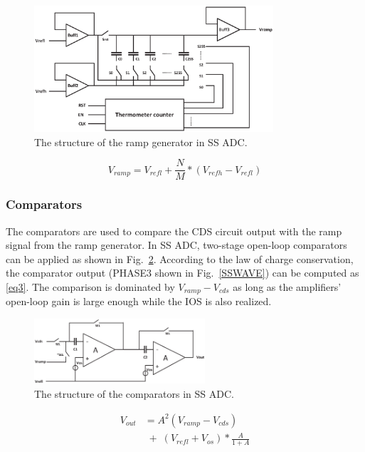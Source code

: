 \begin{figure}[htbp]
	\centerline{\includegraphics[width=3.5in]{./Figures/RAMP.eps}}
	\caption{The structure of the ramp generator in SS ADC.}
	\label{RAMP}
\end{figure} 

\begin{equation}
	V_{ramp}=V_{refl}+\frac{N}{M}\ast\left(V_{refh}-V_{refl}\right)
	\label{eq2}
\end{equation}

\subsubsection{Comparators}

The comparators are used to compare the CDS circuit output with the ramp signal from the ramp generator. 
In SS ADC, two-stage open-loop comparators can be applied as shown in Fig.~\ref{COM}. According to the law of charge conservation, 
the comparator output (PHASE3 shown in Fig.~\ref{SSWAVE}) can be computed as \eqref{eq3}. The comparison is dominated by $V_{ramp}-V_{cds}$ as long as the amplifiers’ open-loop gain 
is large enough while the IOS is also realized.%

\begin{figure}[htbp]
	\centerline{\includegraphics[width=2.5in]{./Figures/COM.eps}}
	\caption{The structure of the comparators in SS ADC.}
	\label{COM}
\end{figure} 

\begin{equation}
	\begin{aligned}
		V_{out}&=A^2(V_{ramp}-V_{cds})\\
		&\;{+}\;\left(V_{refl}+V_{os}\right)\ast\frac{A}{1+A}\\ 		
		\label{eq3}
	\end{aligned}
\end{equation}

